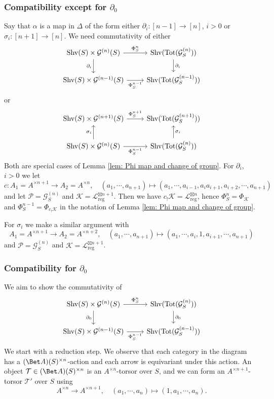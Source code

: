 \documentclass[10pt]{amsart}
\newcommand{\sssec}{\subsubsection}
\theoremstyle{remark}
\newcommand{\pa}{\partial}
\newcommand{\cP}{\mathcal{P}}
\newcommand{\on}{\operatorname}
\newcommand{\cG}{\mathcal{G}}
\newcommand{\cL}{\mathcal{L}}
\newcommand{\cK}{\mathcal{K}}
\newcommand{\cT}{\mathcal{T}}
\newcommand{\Shv}{\on{Shv}}
\begin{document}
\sssec{Compatibility except for $\pa_0$} Say that $\alpha$ is a map in $\Delta$ of the form either $\pa_i:[n-1]\rightarrow [n]$, $i>0$ or $\sigma_i:[n+1]\rightarrow [n]$. We need commutativity of either
\[\begin{tikzcd}
	{\Shv(S)\times\cG^{(n)}(S)} & {\Shv(\on{Tot}(\cG^{(n)}_S))} \\
	{\Shv(S)\times\cG^{(n-1)}(S)} & {\Shv(\on{Tot}(\cG^{(n-1)}_S))}
	\arrow["{\Phi^n_S}", from=1-1, to=1-2]
	\arrow["{\pa_i}"', from=1-1, to=2-1]
	\arrow["{\pa_i}", from=1-2, to=2-2]
	\arrow["{\Phi^{n-1}_S}"', from=2-1, to=2-2]
\end{tikzcd}\]
or
\[\begin{tikzcd}
	{\Shv(S)\times\cG^{(n+1)}(S)} & {\Shv(\on{Tot}(\cG^{(n+1)}_S))} \\
	{\Shv(S)\times\cG^{(n)}(S)} & {\Shv(\on{Tot}(\cG^{(n)}_S))}
	\arrow["{\Phi^{n+1}_S}", from=1-1, to=1-2]
	\arrow["{\sigma_i}", from=2-1, to=1-1]
	\arrow["{\Phi^{n-1}_S}"', from=2-1, to=2-2]
	\arrow["{\sigma_i}"', from=2-2, to=1-2]
\end{tikzcd}\]
Both are special cases of Lemma \ref{lem: Phi map and change of group}. For $\pa_i$, $i>0$ we let 
\[c:A_1= A^{\times n+1}\rightarrow A_2=A^{\times n},\quad (a_1,\cdots,a_{n+1})\mapsto (a_1,\cdots, a_{i-1},a_i a_{i+1},a_{i+2},\cdots,a_{n+1})\]  and let $\cP=\cG^{(n)}_S$ and $\cK=\cL_{\on{reg}}^{\boxtimes n+1}$. Then we have $c_!\cK=\cL^{\boxtimes n}_{\on{reg}}$, hence $\Phi^n_S=\Phi_{\cK}$ and $\Phi^{n-1}_S=\Phi_{c_!\cK}$ in the notation of Lemma \ref{lem: Phi map and change of group}.
\medskip

For $\sigma_i$ we make a similar argument with
\[A_1=A^{\times n+1}\rightarrow A_2=A^{\times n+2},\quad (a_1,\cdots, a_{n+1})\mapsto (a_1,\cdots,a_i,1,a_{i+1},\cdots,a_{n+1})\]
and $\cP=\cG^{(n)}_S$ and $\cK=\cL_{\on{reg}}^{\boxtimes n+1}$.

\sssec{Compatibility for $\pa_0$}
We aim to show the commutativity of
\[\begin{tikzcd}
	{\Shv(S)\times\cG^{(n)}(S)} & {\Shv(\on{Tot}(\cG^{(n)}_S))} \\
	{\Shv(S)\times\cG^{(n-1)}(S)} & {\Shv(\on{Tot}(\cG^{(n-1)}_S))}
	\arrow["{\Phi^n_S}", from=1-1, to=1-2]
	\arrow["{\pa_0}"', from=1-1, to=2-1]
	\arrow["{\pa_0}", from=1-2, to=2-2]
	\arrow["{\Phi^{n-1}_S}"', from=2-1, to=2-2]
\end{tikzcd}\]
We start with a reduction step.
We observe that each category in the diagram has a $(\Bet A)(S)^{\times n}$-action and each arrow is equivariant under this action.
An object $\cT\in (\Bet A)(S)^{\times n}$ is an $A^{\times n}$-torsor over $S$, and we can form an $A^{\times n+1}$-torsor $\cT'$ over $S$ using 
\[A^{\times n}\rightarrow A^{\times n+1},\quad (a_1,\cdots,a_n)\mapsto (1,a_1,\cdots,a_n).\]
\end{document}
